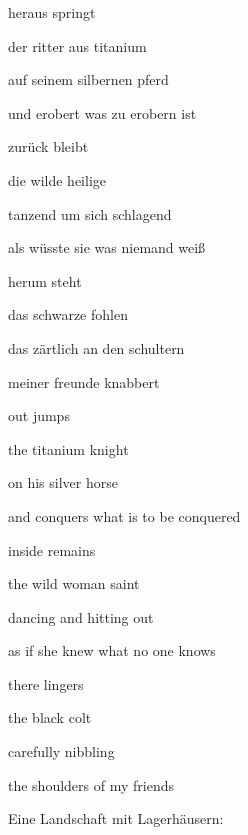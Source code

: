 \bigskip



\bigskip

heraus springt

der ritter aus titanium

auf seinem silbernen pferd


\bigskip

und erobert was zu erobern ist


\bigskip

zurück bleibt

die wilde heilige

tanzend um sich schlagend


\bigskip

als wüsste sie was niemand weiß


\bigskip

herum steht

das schwarze fohlen

das zärtlich an den schultern


\bigskip

meiner freunde knabbert


\bigskip


\bigskip



\bigskip

out jumps

the titanium knight

on his silver horse


\bigskip

and conquers what is to be conquered


\bigskip

inside remains

the wild woman saint

dancing and hitting out 


\bigskip

as if she knew what no one knows


\bigskip

there lingers

the black colt

carefully nibbling 


\bigskip

the shoulders of my friends


\bigskip



\bigskip

Eine Landschaft mit Lagerhäusern:

